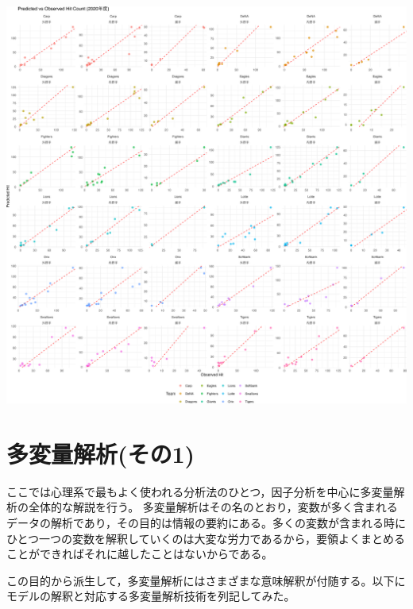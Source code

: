 \documentclass[
  a4paper,
]{ltjsbook}
\begin{document}
\includegraphics[width=1\linewidth,height=\textheight,keepaspectratio]{chapter13_files/figure-pdf/model_fit_visualize-1.png}


\chapter{多変量解析(その1)}\label{ux591aux5909ux91cfux89e3ux6790ux305dux306e1}

ここでは心理系で最もよく使われる分析法のひとつ，因子分析を中心に多変量解析の全体的な解説を行う。
多変量解析はその名のとおり，変数が多く含まれるデータの解析であり，その目的は情報の要約にある。多くの変数が含まれる時にひとつ一つの変数を解釈していくのは大変な労力であるから，要領よくまとめることができればそれに越したことはないからである。

この目的から派生して，多変量解析にはさまざまな意味解釈が付随する。以下にモデルの解釈と対応する多変量解析技術を列記してみた。
\end{document}
